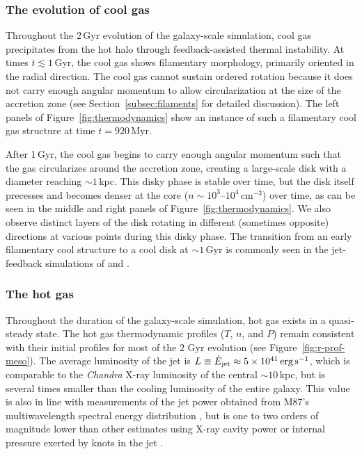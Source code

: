 \subsubsection{The evolution of cool gas}

Throughout the 2\,Gyr evolution of the galaxy-scale simulation, cool gas precipitates from the hot halo through feedback-assisted thermal instability.
At times $t \lesssim 1$\,Gyr, the cool gas shows filamentary morphology, primarily oriented in the radial direction.
The cool gas cannot sustain ordered rotation because it does not carry enough angular momentum to allow circularization at the size of the accretion zone (see Section~\ref{subsec:filaments} for detailed discussion).
The left panels of Figure~\ref{fig:thermodynamics} show an instance of such a filamentary cool gas structure at time $t = 920\,$Myr.

After 1\,Gyr, the cool gas begins to carry enough angular momentum such that the gas circularizes around the accretion zone, creating a large-scale disk with a diameter reaching $\sim 1\,$kpc.
This disky phase is stable over time, but the disk itself precesses and becomes denser at the core ($n \sim 10^3$--$10^4\,\mathrm{cm^{-3}}$) over time, as can be seen in the middle and right panels of Figure~\ref{fig:thermodynamics}.
We also observe distinct layers of the disk rotating in different (sometimes opposite) directions at various points during this disky phase. The transition from an early filamentary cool structure to a cool disk at $\sim 1$\,Gyr is commonly seen in the jet-feedback simulations of \citet{li_2014a} and \citet{wang_agn_2019}.


\subsubsection{The hot gas}

Throughout the duration of the galaxy-scale simulation, hot gas exists in a quasi-steady state.
The hot gas thermodynamic profiles ($T$, $n$, and $P$) remain consistent with their initial profiles for most of the 2 Gyr evolution (see Figure~\ref{fig:r-prof-meso}).
The average luminosity of the jet is $L \equiv \dot{E}_{\rm jet} \approx 5 \times 10^{41}\, \mathrm{erg\,s^{-1}}$, which is comparable to the \textit{Chandra} X-ray luminosity of the central $\sim 10$\,kpc, but is several times smaller than the cooling luminosity of the entire galaxy.
This value is also in line with measurements of the jet power obtained from M87's multiwavelength spectral energy distribution \citep[SED,][]{prieto_central_2016}, but is one to two orders of magnitude lower than other estimates using X-ray cavity power \citep[e.g.,][]{forman_reflections_2005,russell_radiative_2013} or internal pressure exerted by knots in the jet \citep[e.g.,][]{owen_m87_2000,stawarz_dynamics_2006}.

